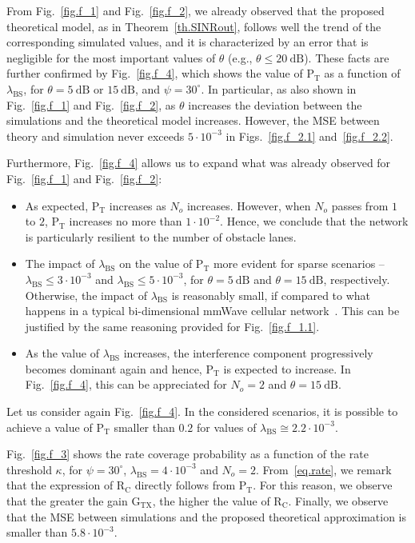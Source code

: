 \documentclass[10pt,journal,a4paper]{IEEEtran}
\begin{document}
From Fig.~\ref{fig.f_1} and Fig.~\ref{fig.f_2}, we already observed that the proposed theoretical model, as in Theorem~\ref{th.SINRout}, follows well the trend of the corresponding simulated values, and it is characterized by an error that is negligible for the most important values of $\theta$ (e.g., $\theta \leq \SI{20}{\dB}$). These facts are further confirmed by Fig.~\ref{fig.f_4}, which shows the value of $\mathrm{P}_{\mathrm{T}}$ as a function of $\lambda_\mathrm{BS}$, for $\theta = \SI{5}{\dB}$ or $\SI{15}{\dB}$, and $\psi = 30^\circ$. In particular, as also shown in Fig.~\ref{fig.f_1} and Fig.~\ref{fig.f_2}, as $\theta$ increases the deviation between the simulations and the theoretical model increases. However, the MSE between theory and simulation never exceeds $5 \cdot 10^{-3}$ in Figs.~\ref{fig.f_2.1} and~\ref{fig.f_2.2}.
{Furthermore, Fig.~\ref{fig.f_4} allows us to expand what was already observed for Fig.~\ref{fig.f_1} and Fig.~\ref{fig.f_2}:
\begin{itemize}
\item As expected, $\mathrm{P}_{\mathrm{T}}$ increases as $N_o$ increases. However, when $N_o$ passes from $1$ to $2$, $\mathrm{P}_{\mathrm{T}}$ increases no more than $1 \cdot 10^{-2}$. Hence, we conclude that the network is particularly resilient to the number of obstacle lanes.
\item The impact of $\lambda_\mathrm{BS}$ on the value of $\mathrm{P}_{\mathrm{T}}$ more evident for sparse scenarios -- $\lambda_\mathrm{BS} \leq 3 \cdot 10^{-3}$ and $\lambda_\mathrm{BS} \leq 5 \cdot 10^{-3}$, for $\theta = \SI{5}{\dB}$ and $\theta = \SI{15}{\dB}$, respectively. Otherwise, the impact of $\lambda_\mathrm{BS}$ is reasonably small, if compared to what happens in a typical bi-dimensional mmWave cellular network~\cite{6932503}. This can be justified by the same reasoning provided for Fig.~\ref{fig.f_1.1}.
\item As the value of $\lambda_\mathrm{BS}$ increases, the interference component progressively becomes dominant again and hence, $\mathrm{P}_{\mathrm{T}}$ is expected to increase. In Fig.~\ref{fig.f_4}, this can be appreciated for $N_o = 2$ and $\theta = \SI{15}{\dB}$.
\end{itemize}
Let us consider again Fig.~\ref{fig.f_4}. In the considered scenarios, it is possible to achieve a value of $\mathrm{P}_{\mathrm{T}}$ smaller than $0.2$ for values of $\lambda_\mathrm{BS} \cong 2.2 \cdot 10^{-3}$.}

Fig.~\ref{fig.f_3} shows the rate coverage probability as a function of the rate threshold $\kappa$, for $\psi = 30^\circ$, $\lambda_\mathrm{BS} = 4 \cdot 10^{-3}$ and \mbox{$N_o = 2$}. From~\eqref{eq.rate}, we remark that the expression of $\mathrm{R}_\mathrm{C}$ directly follows from $\mathrm{P}_{\mathrm{T}}$. For this reason, we observe that the greater the gain $\mathrm{G}_\mathrm{TX}$, the higher the value of $\mathrm{R}_\mathrm{C}$. Finally, we observe that the MSE between simulations and the proposed theoretical approximation is smaller than $5.8 \cdot 10^{-3}$.
\end{document}
